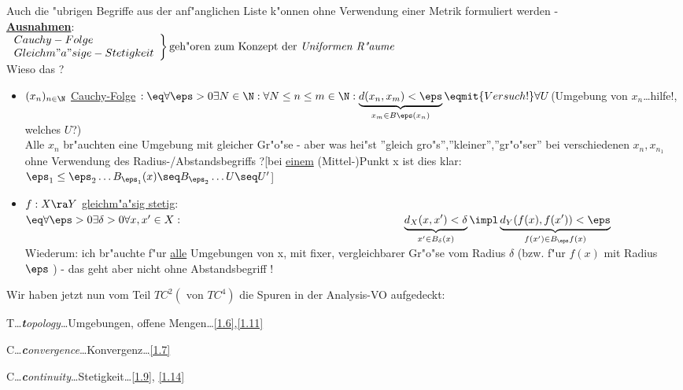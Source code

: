 Auch die "ubrigen Begriffe aus der anf"anglichen Liste k"onnen ohne Verwendung einer Metrik formuliert werden -\\
\ul{\bf Ausnahmen}:\vspace*{0.3cm}\\
$\left.\begin{array}{l} Cauchy-Folge\\
Gleichm"a"sige-Stetigkeit
\end{array}\right\}\mbox{geh"oren zum Konzept der {\it Uniformen R"aume}}$\vspace*{0.3cm}\\
Wieso das ?
\begin{itemize}
\item $(x_n)_{n\in\N}$ \ul{Cauchy-Folge} $:\eq \forall\eps >0\exists N\in\N :\forall N\leq n\leq m\in\N:\underbrace{d(x_n,x_m)<\eps}_{x_m\in B\eps (x_n)}\vspace*{-0.5cm}\\
\eqmit{Versuch!}\forall U$(Umgebung von $x_n$\dots{\sc hilfe!}, welches $U$?)\\
 Alle $x_n$ br"auchten eine Umgebung mit gleicher Gr"o"se - aber was hei"st ''gleich gro"s'',''kleiner'',''gr"o"ser'' bei verschiedenen $x_n,x_{n_1}$ ohne Verwendung des Radius-/Abstandsbegriffs ?[bei \ul{einem} (Mittel-)Punkt x ist dies klar: $\eps_1\leq\eps_2\dots B_{\eps_1}(x)\seq B_{\eps_2}\dots U\seq U'$]
\item $f:X\ra Y$ \ul{gleichm"a"sig stetig}:$\eq\forall\eps >0\exists\delta >0\forall x,x'\in X:\\ \hspace*{7cm}\underbrace{d_X(x,x')<\delta}_{x'\in B_\delta (x)}\impl \underbrace{d_Y(f(x),f(x'))<\eps}_{f(x')\in B_\eps f(x)}$\\
Wiederum: ich br"auchte f"ur \ul{alle} Umgebungen von x, mit fixer, vergleichbarer Gr"o"se vom Radius $\delta$ (bzw. f"ur $f(x)$ mit Radius $\eps$ ) - das geht aber nicht ohne Abstandsbegriff !
\end{itemize}
Wir haben jetzt nun vom Teil $TC^2 (\mbox{ von } TC^4)$ die Spuren in der Analysis-VO aufgedeckt:
\begin{description}
\item T\dots{\it {\bf t}opology}\dots Umgebungen, offene Mengen\dots\ref{1.6},\ref{1.11}
\item C\dots{\it {\bf c}onvergence}\dots Konvergenz\dots\ref{1.7}
\item C\dots{\it {\bf c}ontinuity}\dots Stetigkeit\dots\ref{1.9}, \ref{1.14}
\end{description}
